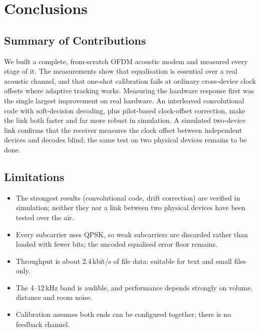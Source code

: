 \documentclass[11pt,a4paper]{report}
\begin{document}
\chapter{Conclusions}

\section{Summary of Contributions}
We built a complete, from-scratch OFDM acoustic modem and measured every stage of
it. The measurements show that equalisation is essential over a real acoustic
channel, and that one-shot calibration fails at ordinary cross-device clock offsets
where adaptive tracking works. Measuring the hardware response first was the single
largest improvement on real hardware. An interleaved convolutional code with
soft-decision decoding, plus pilot-based clock-offset correction, make the link both
faster and far more robust in simulation. A simulated two-device link confirms that
the receiver measures the clock offset between independent devices and decodes
blind; the same test on two physical devices remains to be done.

\section{Limitations}
\begin{itemize}
    \item The strongest results (convolutional code, drift correction) are verified in
    simulation; neither they nor a link between two physical devices have been tested
    over the air.
    \item Every subcarrier uses QPSK, so weak subcarriers are discarded rather than
    loaded with fewer bits; the uncoded equalised error floor remains.
    \item Throughput is about 2.4\,kbit/s of file data: suitable for text and small
    files only.
    \item The 4--12\,kHz band is audible, and performance depends strongly on volume,
    distance and room noise.
    \item Calibration assumes both ends can be configured together; there is no
    feedback channel.
\end{itemize}
\end{document}
